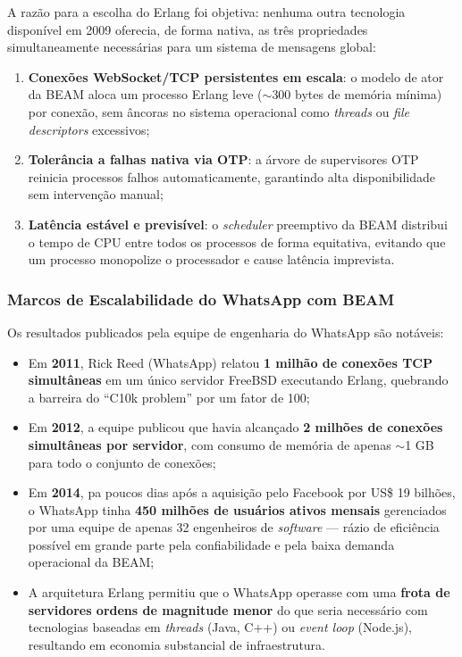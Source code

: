 \documentclass[
	12pt,
	openany,
	oneside,
	a4paper,
	english,
	brazil
]{abntex2}
\begin{document}
A razão para a escolha do Erlang foi objetiva: nenhuma outra tecnologia disponível em 2009 oferecia, de forma nativa, as três propriedades simultaneamente necessárias para um sistema de mensagens global:

\begin{enumerate}
  \item \textbf{Conexões WebSocket/TCP persistentes em escala}: o modelo de ator da BEAM aloca um processo Erlang leve ($\sim$300 bytes de memória mínima) por conexão, sem âncoras no sistema operacional como \textit{threads} ou \textit{file descriptors} excessivos;
  \item \textbf{Tolerância a falhas nativa via OTP}: a árvore de supervisores OTP reinicia processos falhos automaticamente, garantindo alta disponibilidade sem intervenção manual;
  \item \textbf{Latência estável e previsível}: o \textit{scheduler} preemptivo da BEAM distribui o tempo de CPU entre todos os processos de forma equitativa, evitando que um processo monopolize o processador e cause latência imprevista.
\end{enumerate}

\subsubsection{Marcos de Escalabilidade do WhatsApp com BEAM}

Os resultados publicados pela equipe de engenharia do WhatsApp são notáveis:

\begin{itemize}
  \item Em \textbf{2011}, Rick Reed (WhatsApp) relatou \textbf{1 milhão de conexões TCP simultâneas} em um único servidor FreeBSD executando Erlang, quebrando a barreira do ``C10k problem'' por um fator de 100;
  \item Em \textbf{2012}, a equipe publicou que havia alcançado \textbf{2 milhões de conexões simultâneas por servidor}, com consumo de memória de apenas $\sim$1 GB para todo o conjunto de conexões;
  \item Em \textbf{2014}, pa poucos dias após a aquisição pelo Facebook por US\$ 19 bilhões, o WhatsApp tinha \textbf{450 milhões de usuários ativos mensais} gerenciados por uma equipe de apenas 32 engenheiros de \textit{software} --- rázio de eficiência possível em grande parte pela confiabilidade e pela baixa demanda operacional da BEAM;
  \item A arquitetura Erlang permitiu que o WhatsApp operasse com uma \textbf{frota de servidores ordens de magnitude menor} do que seria necessário com tecnologias baseadas em \textit{threads} (Java, C++) ou \textit{event loop} (Node.js), resultando em economia substancial de infraestrutura.
\end{itemize}
\end{document}
